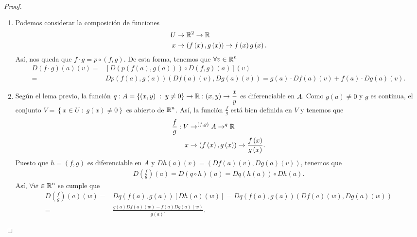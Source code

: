 \begin{proof}
\begin{enumerate}
\item Podemos considerar la composición de funciones
\[
\begin{split}
	U & \to \mathbb{R}^{2} \to \mathbb{R} \\
	x & \to \left(f\left(x\right), g\left(x\right)\right) \to f\left(x\right)g\left(x\right).
\end{split}
\]
Así, nos queda que $\displaystyle f \cdot g = p\circ \left(f,g\right)$. De esta forma, tenemos que $\displaystyle \forall v \in \mathbb{R}^{n} $ 
\[
\begin{split}
	D\left(f \cdot g\right)\left(a\right)\left(v\right) = & \left[D\left(p\left(f\left(a\right), g\left(a\right)\right)\right) \circ D\left(f,g\right)\left(a\right)\right]\left(v\right) \\
= & Dp\left(f\left(a\right), g\left(a\right)\right) \left(Df\left(a\right)\left(v\right), Dg\left(a\right)\left(v\right)\right) = g\left(a\right) \cdot Df\left(a\right)\left(v\right) + f\left(a\right) \cdot Dg\left(a\right)\left(v\right).
\end{split}
\]
\item Según el lema previo, la función $\displaystyle q : A =\left\{ \left(x,y\right) \; : \; y \neq 0\right\}  \to \mathbb{R} : \left(x,y\right) \to \frac{x}{y} $ es diferenciable en $\displaystyle A $. Como $\displaystyle g\left(a\right) \neq 0 $ y $\displaystyle g $ es continua, el conjunto $\displaystyle V = \left\{ x \in U \; : \; g\left(x\right) \neq 0\right\}  $ es abierto de $\displaystyle \mathbb{R}^{n} $. Así, la función $\displaystyle \frac{f}{g} $ está bien definida en $\displaystyle V $ y tenemos que
	\[
	\begin{split}
		\frac{f}{g}: V & \to^{\left(f,g\right)} A \to^{q} \mathbb{R} \\
		x & \to \left(f\left(x\right), g\left(x\right)\right)  \to \frac{f\left(x\right)}{g\left(x\right)}.
	\end{split}
	\]
Puesto que $\displaystyle h = \left(f,g\right) $ es diferenciable en $\displaystyle A $ y $\displaystyle Dh\left(a\right)\left(v\right) = \left(Df\left(a\right)\left(v\right), Dg\left(a\right)\left(v\right)\right) $, tenemos que
\[
\begin{split}
D\left(\frac{f}{g}\right)\left(a\right) = D\left(q\circ h\right)\left(a\right) = Dq\left(h\left(a\right)\right) \circ Dh\left(a\right) .
\end{split}
\]
Así, $\displaystyle \forall w \in \mathbb{R}^{n} $ se cumple que
\[
\begin{split}
	D\left(\frac{f}{g}\right)\left(a\right)\left(w\right) = & Dq\left(f\left(a\right), g\left(a\right)\right)\left[Dh\left(a\right)\left(w\right)\right] = Dq\left(f\left(a\right), g\left(a\right)\right)\left(Df\left(a\right)\left(w\right), Dg\left(a\right)\left(w\right)\right) \\
	= & \frac{g\left(a\right)Df\left(a\right)\left(w\right)-f\left(a\right)Dg\left(a\right)\left(w\right)}{g\left(a\right)^{2}} .
\end{split}
\]
\end{enumerate}
\end{proof}
